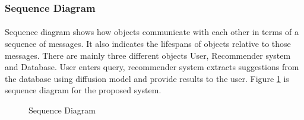 \subsubsection{Sequence Diagram} 
\paragraph{}Sequence diagram shows how objects communicate with each other in terms of a sequence of messages. It also indicates the lifespans of objects relative to those messages. There are mainly three different objects User, Recommender system and Database. User enters query, recommender system extracts suggestions from the database using diffusion model and provide results to the user. Figure \ref{fig:Sequence} is sequence diagram for the proposed system.

\begin{figure}[!h]
\centering
{}
\caption{Sequence Diagram}
\label{fig:Sequence}
\end{figure}
\newpage

